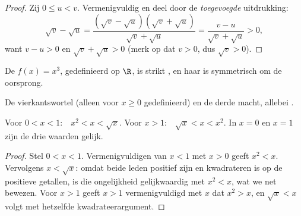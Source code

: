 \begin{proof}
Zij $0 \leq u < v$. Vermenigvuldig en deel door de \emph{toegevoegde}
uitdrukking:
\[
\sqrt v - \sqrt u
= \frac{(\sqrt v - \sqrt u)(\sqrt v + \sqrt u)}{\sqrt v + \sqrt u}
= \frac{v - u}{\sqrt v + \sqrt u} > 0,
\]
want $v - u > 0$ en $\sqrt v + \sqrt u > 0$ (merk op dat $v > 0$, dus
$\sqrt v > 0$).
\end{proof}

\begin{proposition}[Derdemachtsfunctie]\label{prop:g10:reffunc:cube}
De  $f(x) = x^3$, gedefinieerd op $\R$, is strikt , en haar
 is symmetrisch om de oorsprong.
\end{proposition}
\admitted

\begin{omfigure}
\hfill
{}

{\small De vierkantswortel (alleen voor $x \geq 0$ gedefinieerd) en de derde
macht, allebei .}
\end{omfigure}

\begin{proposition}\label{prop:g10:reffunc:compare}
Voor $0 < x < 1$:\ \ $x^2 < x < \sqrt x$.\quad
Voor $x > 1$:\ \ $\sqrt x < x < x^2$.\quad
In $x = 0$ en $x = 1$ zijn de drie waarden gelijk.
\end{proposition}

\begin{proof}
Stel $0 < x < 1$. Vermenigvuldigen van $x < 1$ met $x > 0$ geeft $x^2 < x$.
Vervolgens $x < \sqrt x$: omdat beide leden positief zijn en kwadrateren
 is op de positieve getallen, is die ongelijkheid gelijkwaardig met
$x^2 < x$, wat we net bewezen. Voor $x > 1$ geeft $x > 1$ vermenigvuldigd
met $x$ dat $x^2 > x$, en $\sqrt x < x$ volgt met hetzelfde
kwadrateerargument.
\end{proof}

